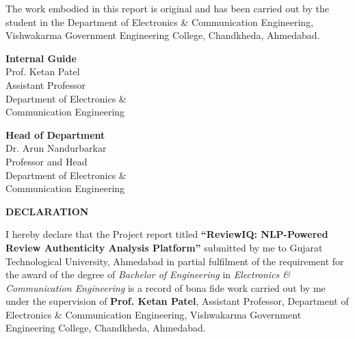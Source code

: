 \documentclass[12pt,a4paper,oneside]{report}
\begin{document}
\vspace{0.6cm}

The work embodied in this report is original and has been carried out by
the student in the Department of Electronics \& Communication Engineering,
Vishwakarma Government Engineering College, Chandkheda, Ahmedabad.

\vspace{2cm}

\begin{singlespace}
\noindent
\begin{minipage}[t]{0.45\textwidth}
\raggedright
\textbf{Internal Guide}\\[0.8cm]
Prof. Ketan Patel\\
Assistant Professor\\
Department of Electronics \&\\
Communication Engineering
\end{minipage}
\hfill
\begin{minipage}[t]{0.45\textwidth}
\raggedleft
\textbf{Head of Department}\\[0.8cm]
Dr. Arun Nandurbarkar\\
Professor and Head\\
Department of Electronics \&\\
Communication Engineering
\end{minipage}
\end{singlespace}

\clearpage
\pagestyle{romanplain}

\clearpage
\thispagestyle{romanplain}

\vspace*{1cm}

{\centering\normalfont\bfseries\fontsize{16}{19.2}\selectfont DECLARATION\par}

\vspace{20pt}

I hereby declare that the Project report titled
\textbf{``ReviewIQ: NLP-Powered Review Authenticity Analysis Platform''}
submitted by me to Gujarat Technological University, Ahmedabad in partial
fulfilment of the requirement for the award of the degree of \textit{Bachelor of
Engineering} in \textit{Electronics \& Communication Engineering} is a
record of bona fide work carried out by me under the supervision of
\textbf{Prof. Ketan Patel}, Assistant Professor, Department of Electronics
\& Communication Engineering, Vishwakarma Government Engineering College,
Chandkheda, Ahmedabad.
\end{document}
